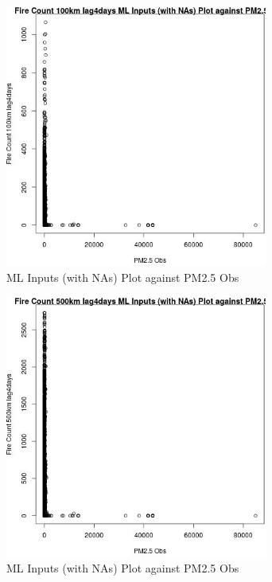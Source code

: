 \begin{figure} 
\centering  
\includegraphics[width=0.77\textwidth]{Code_Outputs/Report_ML_input_PM25_Step4_part_f_de_duplicated_aves_prioritize_24hr_obswNAs_Fire_Count_100km_lag4daysvPM25_Obs.jpg} 
\caption{\label{fig:Report_ML_input_PM25_Step4_part_f_de_duplicated_aves_prioritize_24hr_obswNAsFire_Count_100km_lag4daysvPM25_Obs}ML Inputs (with NAs) Plot against PM2.5 Obs} 
\end{figure} 
 

\clearpage 

\begin{figure} 
\centering  
\includegraphics[width=0.77\textwidth]{Code_Outputs/Report_ML_input_PM25_Step4_part_f_de_duplicated_aves_prioritize_24hr_obswNAs_Fire_Count_500km_lag4daysvPM25_Obs.jpg} 
\caption{\label{fig:Report_ML_input_PM25_Step4_part_f_de_duplicated_aves_prioritize_24hr_obswNAsFire_Count_500km_lag4daysvPM25_Obs}ML Inputs (with NAs) Plot against PM2.5 Obs} 
\end{figure} 
 

